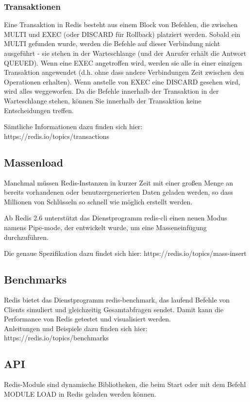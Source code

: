 \subsubsection{Transaktionen}
Eine Transaktion in Redis besteht aus einem Block von Befehlen, die zwischen MULTI und EXEC (oder DISCARD für Rollback) platziert werden. Sobald ein MULTI gefunden wurde, werden die Befehle auf dieser Verbindung nicht ausgeführt - sie stehen in der Warteschlange (und der Anrufer erhält die Antwort QUEUED). Wenn eine EXEC angetroffen wird, werden sie alle in einer einzigen Transaktion angewendet (d.h. ohne dass andere Verbindungen Zeit zwischen den Operationen erhalten). Wenn anstelle von EXEC eine DISCARD gesehen wird, wird alles weggeworfen. Da die Befehle innerhalb der Transaktion in der Warteschlange stehen, können Sie innerhalb der Transaktion keine Entscheidungen treffen.

Sämtliche Informationen dazu finden sich hier: https://redis.io/topics/transactions

\subsection{Massenload}
Manchmal müssen Redis-Instanzen in kurzer Zeit mit einer großen Menge an bereits vorhandenen oder benutzergenerierten Daten geladen werden, so dass Millionen von Schlüsseln so schnell wie möglich erstellt werden.

Ab Redis 2.6 unterstützt das Dienstprogramm redis-cli einen neuen Modus namens Pipe-mode, der entwickelt wurde, um eine Masseneinfügung durchzuführen.

Die genaue Spezifikation dazu findet sich hier: https://redis.io/topics/mass-insert

\subsection{Benchmarks}
Redis bietet das Dienstprogramm redis-benchmark, das laufend Befehle von Clients simuliert und gleichzeitig Gesamtabfragen sendet. Damit kann die Performance von Redis getestet und visualisiert werden.\\
Anleitungen und Beispiele dazu finden sich hier: https://redis.io/topics/benchmarks

\subsection{API}
Redis-Module sind dynamische Bibliotheken, die beim Start oder mit dem Befehl MODULE LOAD in Redis geladen werden können.

